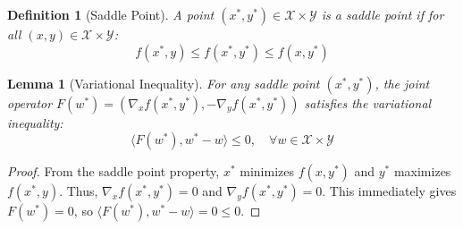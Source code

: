 \documentclass{article}
\newtheorem{lemma}[theorem]{Lemma}
\newtheorem{definition}{Definition}
\begin{document}
\begin{definition}[Saddle Point]
A point $(x^*, y^*) \in \mathcal{X} \times \mathcal{Y}$ is a saddle point if for all $(x,y) \in \mathcal{X} \times \mathcal{Y}$:
$$ f(x^*, y) \leq f(x^*, y^*) \leq f(x, y^*) $$
\end{definition}

\begin{lemma}[Variational Inequality]
For any saddle point $(x^*, y^*)$, the joint operator $F(w^*) = (\nabla_x f(x^*, y^*), -\nabla_y f(x^*, y^*))$ satisfies the variational inequality:
$$ \langle F(w^*), w^* - w \rangle \leq 0, \quad \forall w \in \mathcal{X} \times \mathcal{Y} $$
\end{lemma}
\begin{proof}
From the saddle point property, $x^*$ minimizes $f(x, y^*)$ and $y^*$ maximizes $f(x^*, y)$. Thus, $\nabla_x f(x^*, y^*) = 0$ and $\nabla_y f(x^*, y^*) = 0$. This immediately gives $F(w^*) = 0$, so $\langle F(w^*), w^* - w \rangle = 0 \leq 0$.
\end{proof}
\end{document}
